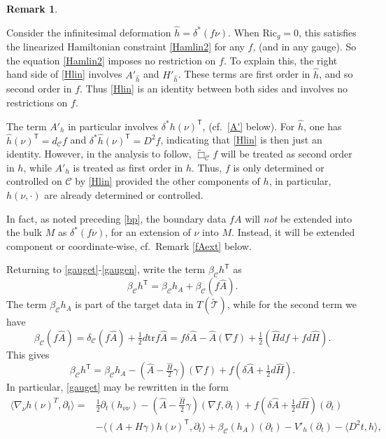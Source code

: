 \documentclass[10pt]{amsart}
\renewcommand{\b}{\beta}
\newcommand{\g}{\gamma}
\renewcommand{\d}{\delta}
\newcommand{\cC}{{\mathcal C}}
\newcommand{\cT}{{\mathcal T}}
\newcommand{\Ric}{\mathrm{Ric}}
\newcommand{\tT}{\mathsf{T}}
\newcommand{\be}{\begin{equation}}
\newcommand{\ee}{\end{equation}}
\newcommand{\tr}{\mathrm{tr}}
\newcommand{\p}{\partial}
\renewcommand{\hat}{\widehat}
\newcommand{\<}{\langle}
\renewcommand{\>}{\rangle}
\newcommand{\w}{\widetilde}
\theoremstyle{plain}
\theoremstyle{remark}
\theoremstyle{definition}
\newtheorem{remark}[lemma]{Remark}
\numberwithin{equation}{section}
\begin{document}
\begin{remark} \label{Id}
 {\rm  Consider the infinitesimal deformation $\hat h = \d^*(f\nu)$. When $\Ric_g = 0$, this satisfies the linearized Hamiltonian constraint \eqref{Hamlin2} 
 for any $f$, (and in any gauge). So the equation \eqref{Hamlin2} imposes no restriction on $f$. To explain this, the right hand side of \eqref{Hlin} involves 
 $A'_{\hat h}$ and $H'_{\hat h}$. These terms are first order in $\hat h$, and so second order in $f$. Thus \eqref{Hlin} is an identity between both sides 
 and involves no restrictions on $f$. 

   The term $A'_h$ in particular involves $\d^* h(\nu)^{\tT}$, (cf.~\eqref{A'} below). For $\hat h$, one has $\hat h(\nu)^{\tT} = d_{\cC}f$ and 
$\d^* \hat h(\nu)^{\tT} = D^2f$, indicating that \eqref{Hlin} is then just an identity. However, in the analysis to follow, $\w \Box_{\cC} f$ will 
be treated as second order in $h$, while $A'_h$ is treated as first order in $h$. Thus, $f$ is only determined or controlled on $\cC$ by \eqref{Hlin} 
provided the other components of $h$, in particular, $h(\nu, \cdot)$ are already determined or controlled. 
   
   In fact, as noted preceding \eqref{bp}, the boundary data $fA$ will {\it not} be extended into the bulk $M$ as $\d^*(f\nu)$, for an extension 
of $\nu$ into $M$. Instead, it will be extended component or coordinate-wise, cf.~Remark \ref{fAext}  below. 
}
\end{remark}

  Returning to \eqref{gauget}-\eqref{gaugen}, write the term $\b_{\cC}h^{\tT}$ as 
$$\b_{\cC}h^{\tT} = \b_{\cC}h_A + \b_{\cC}(f\hat A).$$ 
The term $\b_{\cC}h_A$ is part of the target data in $T(\w \cT)$, while for the second term we have 
$$\b_{\cC}(f\hat A) = \d_{\cC}(f\hat A) + \tfrac{1}{2}d\tr f\hat A = f \d \hat A - \hat A(\nabla f) + \tfrac{1}{2}(\hat Hdf + fd\hat H).$$ 
This gives   
\be \label{bA}
\b_{\cC}h^{\tT} = \b_{\cC} h_A -(\hat A - \tfrac{\hat H}{2}\g)(\nabla f) + f(\d \hat A + \tfrac{1}{2}d\hat H).
\ee
In particular, \eqref{gauget} may be rewritten in the form 
\be \label{gt}
\begin{split}
\<\nabla_{\nu}h(\nu)^T, \p_t\> = & \tfrac{1}{2}\p_t (h_{\nu \nu}) - (\hat A - \tfrac{\hat H}{2}\g)(\nabla f, \p_t) + f(\d \hat A + \tfrac{1}{2}d\hat H)(\p_t) \\
&-\<(A + H\g)h(\nu)^{\tT}, \p_t\> + \b_{\cC}(h_A)(\p_t) - V'_h(\p_t) - \<D^2t, h\>,\\
\end{split}
\ee
\end{document}
